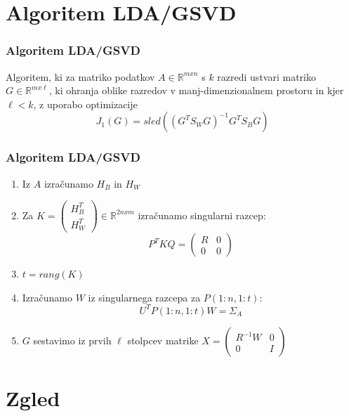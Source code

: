 \documentclass{beamer}
\begin{document}
\section{Algoritem LDA/GSVD}
\begin{frame}
\frametitle{Algoritem LDA/GSVD} 
Algoritem, ki za matriko podatkov $A \in \mathbb{R}^{ m x n } $ s $k$ razredi ustvari matriko $G  \in \mathbb{R}^{ m x \ell }$, ki ohranja oblike razredov v manj-dimenzionalnem prostoru in kjer $\ell < k$, z uporabo optimizacije
$$J_1(G) = sled((G^T S_W G)^{-1}G^T S_B G)$$

\end{frame}

\begin{frame}
\frametitle{Algoritem LDA/GSVD} 
\begin{enumerate}
\item Iz $A$ izračunamo $H_B$ in $H_W$
\item Za $K = \left(\begin{array}{c} H_B^T \\ H_W^T \end{array}\right) \in \mathbb{R}^{2nxm}$ izračunamo singularni razcep:$$ P^T K Q =\left(\begin{array}{cc} R & 0\\ 0 & 0 \end{array}\right)$$
\item $t = rang(K)$
\item Izračunamo $W$ iz singularnega razcepa za $P(1:n, 1:t)$:$$U^T P(1:n, 1:t) W = \Sigma_A$$
\item $G$ sestavimo iz prvih $\ell$ stolpcev matrike $X = \left(\begin{array}{cc} R^{-1}W & 0\\ 0 & I \end{array}\right)$
\end{enumerate}
\end{frame}


\section{Zgled}
\end{document}
